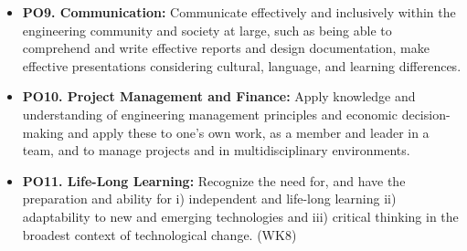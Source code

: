 \begin{itemize}[label={}]
  \item \textbf{PO9. Communication:} Communicate effectively and inclusively within the engineering community and society at large, such as being able to comprehend and write effective reports and design documentation, make effective presentations considering cultural, language, and learning differences.
  \item \textbf{PO10. Project Management and Finance:} Apply knowledge and understanding of engineering management principles and economic decision-making and apply these to one's own work, as a member and leader in a team, and to manage projects and in multidisciplinary environments.
  \item \textbf{PO11. Life-Long Learning:} Recognize the need for, and have the preparation and ability for i) independent and life-long learning ii) adaptability to new and emerging technologies and iii) critical thinking in the broadest context of technological change. (WK8)
\end{itemize}

